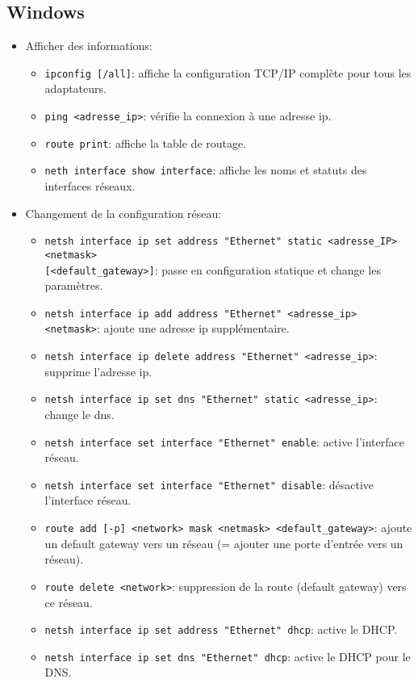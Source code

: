 \documentclass[a4paper]{article}
\renewcommand{\tt}{\texttt}
\begin{document}
\subsection{Windows}





\begin{itemize}





\item Afficher des informations:
\begin{itemize}
    \item \tt{ipconfig [/all]}: affiche la configuration TCP/IP complète pour tous les adaptateurs.
    \item \tt{ping <adresse\_ip>}: vérifie la connexion à une adresse ip.
    \item \tt{route print}: affiche la table de routage.
    \item \tt{neth interface show interface}: affiche les noms et statuts des interfaces réseaux.
\end{itemize}





\item Changement de la configuration réseau:
\begin{itemize}
    \item \tt{netsh interface ip set address "Ethernet" static <adresse\_IP> <netmask>} \\
    \tt{[<default\_gateway>]}: passe en configuration statique et change les paramètres.
    \item \tt{netsh interface ip add address "Ethernet" <adresse\_ip> <netmask>}: ajoute une adresse ip supplémentaire.
    \item \tt{netsh interface ip delete address "Ethernet" <adresse\_ip>}: supprime l'adresse ip.
    \item \tt{netsh interface ip set dns "Ethernet" static <adresse\_ip>}: change le dns.
    \item \tt{netsh interface set interface "Ethernet" enable}: active l'interface réseau.
    \item \tt{netsh interface set interface "Ethernet" disable}: désactive l'interface réseau.
    \item \tt{route add [-p] <network> mask <netmask> <default\_gateway>}: ajoute un default gateway vers un réseau (= ajouter une porte d'entrée vers un réseau).
    \item \tt{route delete <network>}: suppression de la route (default gateway) vers ce réseau.
    \item \tt{netsh interface ip set address "Ethernet" dhcp}: active le DHCP.
    \item \tt{netsh interface ip set dns "Ethernet" dhcp}: active le DHCP pour le DNS.
\end{itemize}






\end{itemize}
\end{document}

